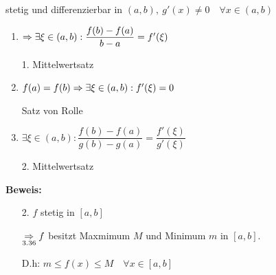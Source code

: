 \documentclass[10pt, a4paper, fleqn]{article}
\begin{document}
stetig und differenzierbar in $(a, b), \ g'(x) \neq 0 \quad \forall x \in (a, b)$
\begin{enumerate}[1.]
    \item
    $\Rightarrow \exists \xi \in (a, b): \dfrac{f(b) - f(a)}{b - a} = f'(\xi)$

    1. Mittelwertsatz

    \item
    $f(a) = f(b) \Rightarrow \exists \xi \in (a, b): f'(\xi) = 0$

    Satz von Rolle

    \item
    $\exists \xi \in (a,b): \dfrac{f(b) - f(a)}{g(b) - g(a)} = \dfrac{f'(\xi)}{g'(\xi)}$

    2. Mittelwertsatz
\end{enumerate}
\textbf{Beweis: }
\begin{enumerate}
    \item [2.] $f$ stetig in $[a, b]$

    $\underset{3.36}{\Rightarrow} f$ besitzt Maxmimum $M$ und Minimum $m$ in $[a, b]$.

    D.h: $m \leq f(x) \leq M \quad \forall x \in [a, b]$
\end{enumerate}
\ifdefined\MAINDOC\else
\end{document}
